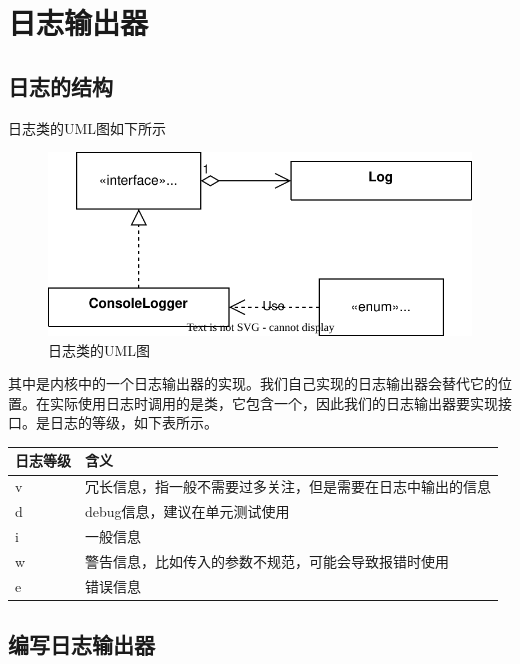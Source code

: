 \section[日志输出器]{日志输出器}\label{sec:日志输出器}

\subsection[日志的结构]{日志的结构}\label{subsec:日志的结构}

日志类的UML图如下所示

\begin{figure}[h]
    \label{fig:日志结构}
    \centering
    \includegraphics{img/日志类结构.svg}
    \caption{日志类的UML图}
\end{figure}

其中是内核中的一个日志输出器的实现。我们自己实现的日志输出器会替代它的位置。在实际使用日志时调用的是类，它包含一个，因此我们的日志输出器要实现接口。是日志的等级，如下表所示。

\begin{longtable}{p{2cm}|p{9cm}}
    日志等级 & 含义 \\
    \hline
    v & 冗长信息，指一般不需要过多关注，但是需要在日志中输出的信息\\
    \hline
    d & debug信息，建议在单元测试使用\\
    \hline
    i & 一般信息\\
    \hline
    w & 警告信息，比如传入的参数不规范，可能会导致报错时使用\\
    \hline
    e & 错误信息
\end{longtable}

\subsection[编写日志输出器]{编写日志输出器}\label{subsec:编写日志输出器}

